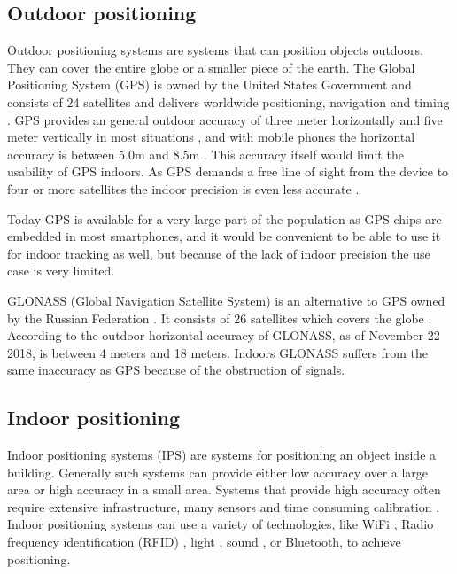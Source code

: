 \documentclass[../Main/thesis.tex]{subfiles}
\begin{document}
\subsection{Outdoor positioning}
Outdoor positioning systems are systems that can position objects outdoors.
They can cover the entire globe or a smaller piece of the earth.
The Global Positioning System (GPS) is owned by the United States Government and consists of 24 satellites and delivers worldwide positioning, navigation and timing \citep{U.S.DepartmentofDefence2008}.
GPS provides an general outdoor accuracy of three meter horizontally and five meter vertically in most situations \citep{U.S.DepartmentofDefence2008}, and with mobile phones the horizontal accuracy is between 5.0m and 8.5m \citep{Zandbergen2011a}.
This accuracy itself would limit the usability of GPS indoors.
As GPS demands a free line of sight from the device to four or more satellites the indoor precision is even less accurate \citep{Zandbergen2011a}.

Today GPS is available for a very large part of the population as GPS chips are embedded in most smartphones, and it would be convenient to be able to use it for indoor tracking as well, but because of the lack of indoor precision the use case is very limited.

GLONASS (Global Navigation Satellite System) is an alternative to GPS owned by the Russian Federation \citep{InformationandAnalysisCenterforPositioningNavigationandTiming2018}.
It consists of 26 satellites which covers the globe \citep{InformationandAnalysisCenterforPositioningNavigationandTiming2018a}.
According to \citet{Russiansystemofdifferentionalcorrectionandmonitoring2018} the outdoor horizontal accuracy of GLONASS, as of November 22 2018, is between 4 meters and 18 meters.
Indoors GLONASS suffers from the same inaccuracy as GPS because of the obstruction of signals.

\subsection{Indoor positioning}
\label{sec:indoor-positioning}
Indoor positioning systems (IPS) are systems for positioning an object inside a building.
Generally such systems can provide either low accuracy over a large area or high accuracy in a small area.
Systems that provide high accuracy often require extensive infrastructure, many sensors and time consuming calibration \citep{Curran2011}.
Indoor positioning systems can use a variety of technologies, like WiFi \citep{chang2010robust}, Radio frequency identification (RFID) \citep{Saab2011}, light \citep{xiaohan2010improved}, sound \citep{schweinzer2010ultrasonic}, or Bluetooth, to achieve positioning.
\end{document}
